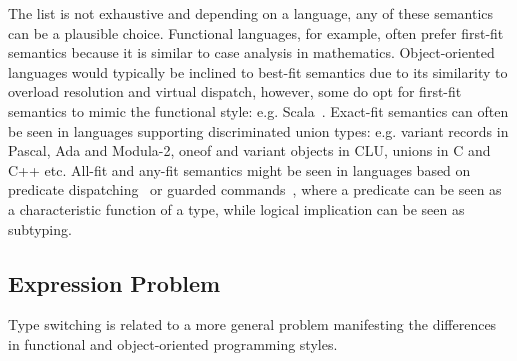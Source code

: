 \noindent
The list is not exhaustive and depending on a language, any of these semantics 
can be a plausible choice. Functional languages, for example, often prefer 
first-fit semantics because it is similar to case analysis in mathematics. 
Object-oriented languages would typically be inclined to best-fit semantics due 
to its similarity to overload resolution and virtual dispatch, however, some 
do opt for first-fit semantics to mimic the functional style: e.g. Scala~\cite{Scala2nd}. 
Exact-fit semantics can often be seen in languages supporting discriminated 
union types: e.g. variant records in Pascal, Ada and Modula-2, oneof and variant 
objects in CLU, unions in C and C++ etc.
All-fit and any-fit semantics might be seen in languages based on predicate 
dispatching~\cite{ErnstKC98} or guarded commands~\cite{EWD:EWD472}, where a 
predicate can be seen as a characteristic function of a type, while logical 
implication can be seen as subtyping.

\subsection{Expression Problem}

Type switching is related to a more general problem manifesting the differences 
in functional and object-oriented programming styles.

%

